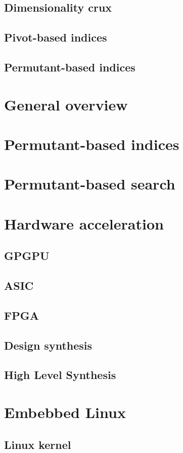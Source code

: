 \documentclass{iccmemoria}
\begin{document}
    \subsection{Dimensionality crux}
    \subsection{Pivot-based indices}
    \subsection{Permutant-based indices}
  \section{General overview}
  \section{Permutant-based indices}

  \section{Permutant-based search}
  \section{Hardware acceleration}
    \subsection{GPGPU}
    \subsection{ASIC}
    \subsection{FPGA}
    \subsection{Design synthesis}
    \subsection{High Level Synthesis}
  \section{Embebbed Linux} 
    \subsection{Linux kernel}
\end{document}
